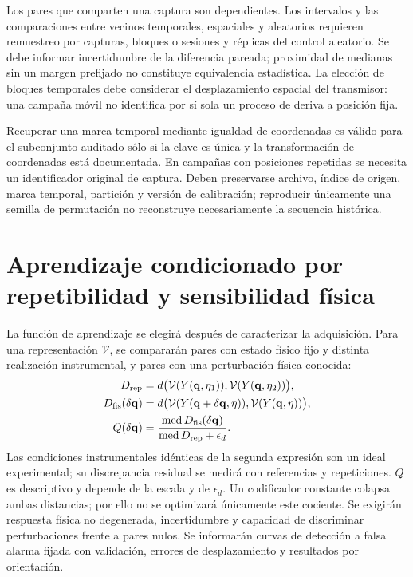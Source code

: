 Los pares que comparten una captura son dependientes. Los intervalos y las
comparaciones entre vecinos temporales, espaciales y aleatorios requieren
remuestreo por capturas, bloques o sesiones y réplicas del control aleatorio.
Se debe informar incertidumbre de la diferencia pareada; proximidad de medianas
sin un margen prefijado no constituye equivalencia estadística. La elección de
bloques temporales debe considerar el desplazamiento espacial del transmisor:
una campaña móvil no identifica por sí sola un proceso de deriva a posición fija.

Recuperar una marca temporal mediante igualdad de coordenadas es válido para
el subconjunto auditado sólo si la clave es única y la transformación de
coordenadas está documentada. En campañas con posiciones repetidas se necesita
un identificador original de captura. Deben preservarse archivo, índice de
origen, marca temporal, partición y versión de calibración; reproducir únicamente
una semilla de permutación no reconstruye necesariamente la secuencia histórica.

\section{Aprendizaje condicionado por repetibilidad y sensibilidad física}
\label{sec:repeatability_sensitivity_learning}

La función de aprendizaje se elegirá después de caracterizar la adquisición. Para una
representación $\mathcal V$, se compararán pares con estado físico fijo y distinta
realización instrumental, y pares con una perturbación física conocida:
\begin{align}
D_{\rm rep}&=d\bigl(\mathcal V(Y(\mathbf q,\eta_1)),
\mathcal V(Y(\mathbf q,\eta_2))\bigr),\nonumber\\
D_{\rm fis}(\delta\mathbf q)&=d\bigl(\mathcal V(Y(\mathbf q+\delta\mathbf q,\eta)),
\mathcal V(Y(\mathbf q,\eta))\bigr),\label{eq:repeat_physical_distances}\\
Q(\delta\mathbf q)&=\frac{\operatorname{med}D_{\rm fis}(\delta\mathbf q)}
{\operatorname{med}D_{\rm rep}+\epsilon_d}.
\label{eq:physical_repeatability_ratio}
\end{align}
Las condiciones instrumentales idénticas de la segunda expresión son un ideal
experimental; su discrepancia residual se medirá con referencias y repeticiones.
$Q$ es descriptivo y depende de la escala y de $\epsilon_d$. Un codificador constante
colapsa ambas distancias; por ello no se optimizará únicamente este cociente.
Se exigirán respuesta física no degenerada, incertidumbre y capacidad de discriminar
perturbaciones frente a pares nulos. Se informarán curvas de detección a falsa alarma
fijada con validación, errores de desplazamiento y resultados por orientación.

